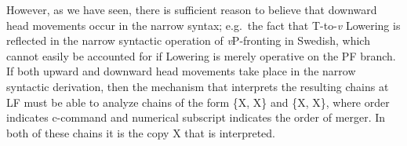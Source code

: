 However, as we have seen, there is sufficient reason to believe that downward head movements occur in the narrow syntax; e.g.\ the fact that T-to-{\it v} Lowering is reflected in the narrow syntactic operation of {\it v}P-fronting in Swedish, which cannot easily be accounted for if Lowering is merely operative on the PF branch. If both upward and downward head movements take place in the narrow syntactic derivation, then the mechanism that interprets the resulting chains at LF must be able to analyze chains of the form \{X, X\} and \{X, X\}, where order indicates c-command and numerical subscript indicates the order of merger. In both of these chains it is the copy X that is interpreted.

